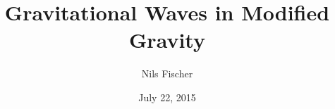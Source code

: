 \documentclass[print,twoside]{bsc}
\title{Gravitational Waves in Modified Gravity}
\author{Nils Fischer}
\date{July 22, 2015}
\begin{document}




\cleardoublepage
\tableofcontents
\listoffigures

\cleardoublepage{}








\cleardoublepage
\begin{appendices}


\end{appendices}

\printbibliography


\end{document}
